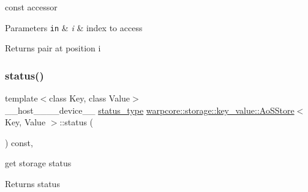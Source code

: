 const accessor 


\begin{DoxyParams}[1]{Parameters}
\mbox{\tt in}  & {\em i} & index to access \\
\hline
\end{DoxyParams}
\begin{DoxyReturn}{Returns}
pair at position {\ttfamily i} 
\end{DoxyReturn}
\mbox{\label{classwarpcore_1_1storage_1_1key__value_1_1AoSStore_a040cd6b5abf7ad6b2f20d44d5bae38bf}} 
\subsubsection{\texorpdfstring{status()}{status()}}
{\footnotesize\ttfamily template$<$class Key, class Value$>$ \\
\+\_\+\+\_\+host\+\_\+\+\_\+\+\_\+\+\_\+device\+\_\+\+\_\+ \hyperlink{classwarpcore_1_1Status}{status\+\_\+type} \hyperlink{classwarpcore_1_1storage_1_1key__value_1_1AoSStore}{warpcore\+::storage\+::key\+\_\+value\+::\+Ao\+S\+Store}$<$ Key, Value $>$\+::status (\begin{DoxyParamCaption}{ }\end{DoxyParamCaption}) const\hspace{0.3cm}{\ttfamily [inline]}, {\ttfamily [noexcept]}}



get storage status 

\begin{DoxyReturn}{Returns}
status 
\end{DoxyReturn}
